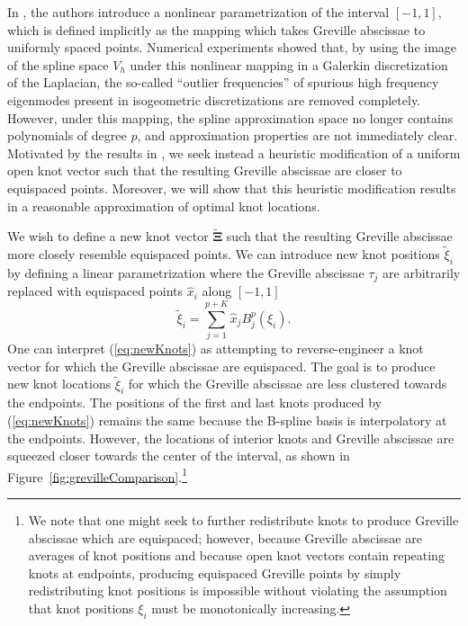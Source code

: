 \documentclass[preprint,10pt]{elsarticle}
\newcommand{\reviewerOne}[1]{#1}
\begin{document}
In \cite{hughes2008duality}, the authors introduce a nonlinear parametrization of the interval $[-1,1]$, which is defined implicitly as the mapping which takes Greville abscissae to uniformly spaced points.  Numerical experiments showed that, by using the image of the spline space $V_h$ under this nonlinear mapping in a Galerkin discretization of the Laplacian, the so-called ``outlier frequencies'' of spurious high frequency eigenmodes present in isogeometric discretizations are removed completely.  However, under this mapping, the spline approximation space no longer contains polynomials of degree $p$, and approximation properties are not immediately clear.  Motivated by the results in \cite{hughes2008duality}, we seek instead a heuristic modification of a uniform open knot vector such that the resulting Greville abscissae are closer to equispaced points.  Moreover, we will show that this heuristic modification results in a reasonable approximation of optimal knot locations.   %

We wish to define a new knot vector $\tilde{\bm{\Xi}}$ such that the resulting Greville abscissae more closely resemble equispaced points.  We can introduce new knot positions $\tilde{\xi}_i$ by defining a linear parametrization where the Greville abscissae $\tau_j$ are \reviewerOne{arbitrarily} replaced with equispaced points $\widehat{x}_i$ along $[-1,1]$
\begin{equation}
\tilde{\xi}_i = \sum_{j=1}^{p+K} \reviewerOne{\widehat{x}_j} B^p_j(\xi_i).  
\label{eq:newKnots}
\end{equation}
\reviewerOne{One can interpret (\ref{eq:newKnots}) as attempting to reverse-engineer a knot vector for which the Greville abscissae are equispaced.  The goal is to produce new knot locations $\tilde{\xi}_i$ for which the Greville abscissae are less clustered towards the endpoints. }  The positions of the first and last knots produced by (\ref{eq:newKnots}) remains the same because the B-spline basis is interpolatory at the endpoints.  However, the locations of interior knots and Greville abscissae are squeezed closer towards the center of the interval, as shown in Figure~\ref{fig:grevilleComparison}.\footnote{We note that one might seek to further redistribute knots to produce Greville abscissae which are equispaced; however, because Greville abscissae are averages of knot positions and because open knot vectors contain repeating knots at endpoints, producing equispaced Greville points by simply redistributing knot positions is impossible without violating the assumption that knot positions $\xi_i$ must be monotonically increasing.}  
\end{document}
